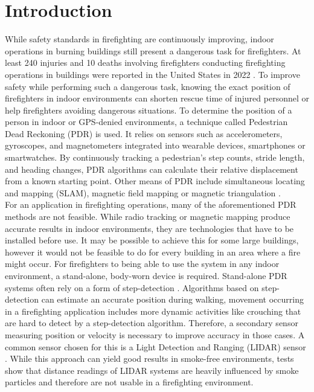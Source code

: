 \documentclass[engproc,conferenceproceedings,submit,pdftex,moreauthors]{Definitions/mdpi}
\begin{document}

\section{Introduction}

While safety standards in firefighting are continuously improving, indoor operations in burning buildings still present a dangerous task for firefighters. At least 240 injuries and 10 deaths involving firefighters conducting firefighting operations in buildings were reported in the United States in 2022 \cite{atemschutzunfalle.eu2023}. To improve safety while performing such a dangerous task, knowing the exact position of firefighters in indoor environments can shorten rescue time of injured personnel or help firefighters avoiding dangerous situations. To determine the position of a person in indoor or GPS-denied environments, a technique called Pedestrian Dead Reckoning (PDR) is used. It relies on sensors such as accelerometers, gyroscopes, and magnetometers integrated into wearable devices, smartphones or smartwatches. By continuously tracking a pedestrian's step counts, stride length, and heading changes, PDR algorithms can calculate their relative displacement from a known starting point. Other means of PDR include simultaneous locating and mapping (SLAM)\cite{lu2019}, magnetic field mapping \cite{wang2016} or magnetic triangulation \cite{arumugam2020}.\\

For an application in firefighting operations, many of the aforementioned PDR methods are not feasible. While radio tracking \cite{cong2023} or magnetic mapping \cite{wang2016} produce accurate results in indoor environments, they are technologies that have to be installed before use. It may be possible to achieve this for some large buildings, however it would not be feasible to do for every building in an area where a fire might occur. For firefighters to being able to use the system in any indoor environment, a stand-alone, body-worn device is required. Stand-alone PDR systems often rely on a form of step-detection \cite{hou2021}. Algorithms based on step-detection can estimate an accurate position during walking, movement occurring in a firefighting application includes more dynamic activities like crouching that are hard to detect by a step-detection algorithm. Therefore, a secondary sensor measuring position or velocity is necessary to improve accuracy in those cases. A common sensor chosen for this is a Light Detection and Ranging (LIDAR) sensor \cite{wang2016}. While this approach can yield good results in smoke-free environments, tests show that distance readings of LIDAR systems are heavily influenced by smoke particles and therefore are not usable in a firefighting environment. \\
\end{document}
